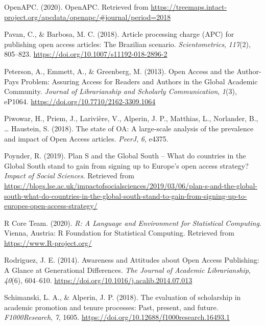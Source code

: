 \documentclass[english,man]{apa6}
\begin{document}
\leavevmode\hypertarget{ref-openapc_openapc_2020}{}%
OpenAPC. (2020). OpenAPC. Retrieved from \url{https://treemaps.intact-project.org/apcdata/openapc/\#journal/period=2018}

\leavevmode\hypertarget{ref-pavan_article_2018}{}%
Pavan, C., \& Barbosa, M. C. (2018). Article processing charge (APC) for publishing open access articles: The Brazilian scenario. \emph{Scientometrics}, \emph{117}(2), 805--823. \url{https://doi.org/10.1007/s11192-018-2896-2}

\leavevmode\hypertarget{ref-peterson_open_2013}{}%
Peterson, A., Emmett, A., \& Greenberg, M. (2013). Open Access and the Author-Pays Problem: Assuring Access for Readers and Authors in the Global Academic Community. \emph{Journal of Librarianship and Scholarly Communication}, \emph{1}(3), eP1064. \url{https://doi.org/10.7710/2162-3309.1064}

\leavevmode\hypertarget{ref-piwowar_state_2018}{}%
Piwowar, H., Priem, J., Larivière, V., Alperin, J. P., Matthias, L., Norlander, B., \ldots{} Haustein, S. (2018). The state of OA: A large-scale analysis of the prevalence and impact of Open Access articles. \emph{PeerJ}, \emph{6}, e4375.

\leavevmode\hypertarget{ref-poynder_plan_2019}{}%
Poynder, R. (2019). Plan S and the Global South -- What do countries in the Global South stand to gain from signing up to Europe's open access strategy? \emph{Impact of Social Sciences}. Retrieved from \url{https://blogs.lse.ac.uk/impactofsocialsciences/2019/03/06/plan-s-and-the-global-south-what-do-countries-in-the-global-south-stand-to-gain-from-signing-up-to-europes-open-access-strategy/}

\leavevmode\hypertarget{ref-r_core_team_r_2020}{}%
R Core Team. (2020). \emph{R: A Language and Environment for Statistical Computing}. Vienna, Austria: R Foundation for Statistical Computing. Retrieved from \url{https://www.R-project.org/}

\leavevmode\hypertarget{ref-rodriguez_awareness_2014}{}%
Rodriguez, J. E. (2014). Awareness and Attitudes about Open Access Publishing: A Glance at Generational Differences. \emph{The Journal of Academic Librarianship}, \emph{40}(6), 604--610. \url{https://doi.org/10.1016/j.acalib.2014.07.013}

\leavevmode\hypertarget{ref-schimanski_evaluation_2018}{}%
Schimanski, L. A., \& Alperin, J. P. (2018). The evaluation of scholarship in academic promotion and tenure processes: Past, present, and future. \emph{F1000Research}, \emph{7}, 1605. \url{https://doi.org/10.12688/f1000research.16493.1}
\end{document}
